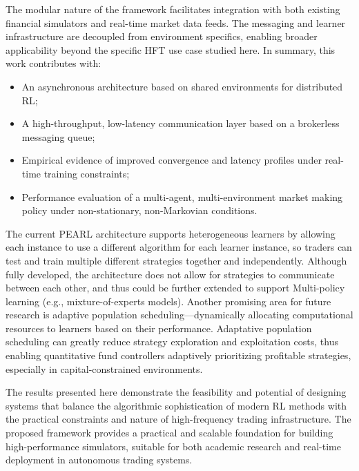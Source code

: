 The modular nature of the framework facilitates integration with both existing financial simulators and real-time market data feeds.
The messaging and learner infrastructure are decoupled from environment specifics, enabling broader applicability beyond the specific HFT use case studied here.
In summary, this work contributes with:
\begin{itemize}
    \item An asynchronous architecture based on shared environments for distributed RL;
    \item A high-throughput, low-latency communication layer based on a brokerless messaging queue;
    \item Empirical evidence of improved convergence and latency profiles under real-time training constraints;
    \item Performance evaluation of a multi-agent, multi-environment market making policy under non-stationary, non-Markovian conditions.
\end{itemize}

The current PEARL architecture supports heterogeneous learners by allowing each instance to use a different algorithm
for each learner instance, so traders can test and train multiple different strategies together and independently.
Although fully developed, the architecture does not allow for strategies to communicate between each other,
and thus could be further extended to support Multi-policy learning (e.g., mixture-of-experts models).
Another promising area for future research is adaptive population scheduling—dynamically allocating computational resources to learners based on their performance.
Adaptative population scheduling can greatly reduce strategy exploration and exploitation costs,
thus enabling quantitative fund controllers adaptively prioritizing profitable strategies, especially in capital-constrained environments.

The results presented here demonstrate the feasibility and potential of designing systems that balance the algorithmic sophistication of
modern RL methods with the practical constraints and nature of high-frequency trading infrastructure.
The proposed framework provides a practical and scalable foundation for building high-performance simulators,
suitable for both academic research and real-time deployment in autonomous trading systems.
